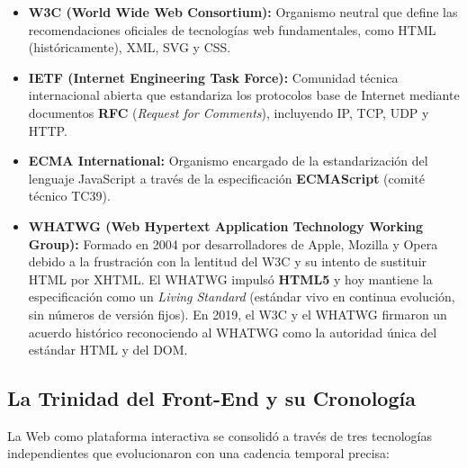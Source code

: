 \begin{itemize}[leftmargin=1.2cm]
  \item \textbf{W3C (World Wide Web Consortium):} Organismo neutral que define las recomendaciones oficiales de tecnologías web fundamentales, como HTML (históricamente), XML, SVG y CSS.
  \item \textbf{IETF (Internet Engineering Task Force):} Comunidad técnica internacional abierta que estandariza los protocolos base de Internet mediante documentos \textbf{RFC} (\textit{Request for Comments}), incluyendo IP, TCP, UDP y HTTP.
  \item \textbf{ECMA International:} Organismo encargado de la estandarización del lenguaje JavaScript a través de la especificación \textbf{ECMAScript} (comité técnico TC39).
  \item \textbf{WHATWG (Web Hypertext Application Technology Working Group):} Formado en 2004 por desarrolladores de Apple, Mozilla y Opera debido a la frustración con la lentitud del W3C y su intento de sustituir HTML por XHTML. El WHATWG impulsó \textbf{HTML5} y hoy mantiene la especificación como un \textit{Living Standard} (estándar vivo en continua evolución, sin números de versión fijos). En 2019, el W3C y el WHATWG firmaron un acuerdo histórico reconociendo al WHATWG como la autoridad única del estándar HTML y del DOM.
\end{itemize}

\subsection{La Trinidad del Front-End y su Cronología}

La Web como plataforma interactiva se consolidó a través de tres tecnologías independientes que evolucionaron con una cadencia temporal precisa:

